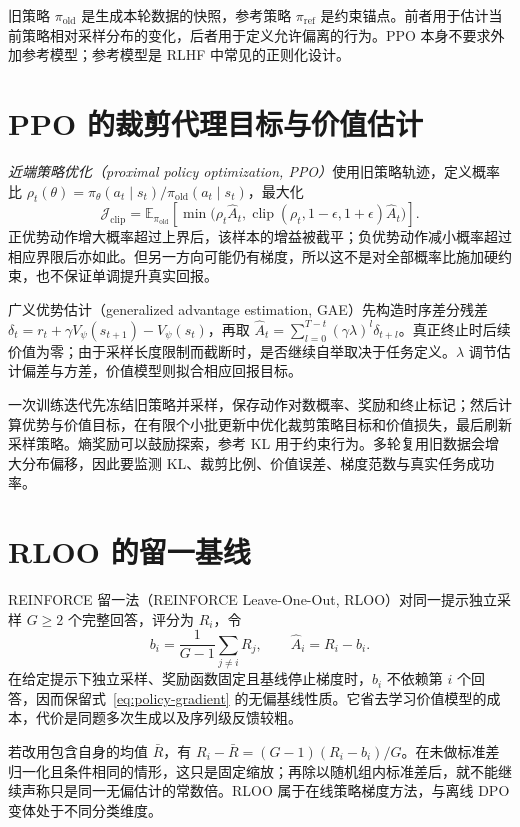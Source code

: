 旧策略 $\pi_{\mathrm{old}}$ 是生成本轮数据的快照，参考策略 $\pi_{\mathrm{ref}}$ 是约束锚点。前者用于估计当前策略相对采样分布的变化，后者用于定义允许偏离的行为。PPO 本身不要求外加参考模型；参考模型是 RLHF 中常见的正则化设计。

\section{PPO 的裁剪代理目标与价值估计}

\emph{近端策略优化（proximal policy optimization, PPO）}使用旧策略轨迹，定义概率比 $\rho_t(\theta)=\pi_\theta(a_t\mid s_t)/\pi_{\mathrm{old}}(a_t\mid s_t)$，最大化
\begin{equation}
\mathcal J_{\mathrm{clip}}=\mathbb E_{\pi_{\mathrm{old}}}\left[
\min\bigl(\rho_t\widehat A_t,
\operatorname{clip}(\rho_t,1-\epsilon,1+\epsilon)\widehat A_t\bigr)\right].
\label{eq:ppo}
\end{equation}
正优势动作增大概率超过上界后，该样本的增益被截平；负优势动作减小概率超过相应界限后亦如此。但另一方向可能仍有梯度，所以这不是对全部概率比施加硬约束，也不保证单调提升真实回报\cite{ppo}。

广义优势估计（generalized advantage estimation, GAE）先构造时序差分残差 $\delta_t=r_t+\gamma V_\psi(s_{t+1})-V_\psi(s_t)$，再取 $\widehat A_t=\sum_{l=0}^{T-t}(\gamma\lambda)^l\delta_{t+l}$。真正终止时后续价值为零；由于采样长度限制而截断时，是否继续自举取决于任务定义。$\lambda$ 调节估计偏差与方差，价值模型则拟合相应回报目标。

一次训练迭代先冻结旧策略并采样，保存动作对数概率、奖励和终止标记；然后计算优势与价值目标，在有限个小批更新中优化裁剪策略目标和价值损失，最后刷新采样策略。熵奖励可以鼓励探索，参考 KL 用于约束行为。多轮复用旧数据会增大分布偏移，因此要监测 KL、裁剪比例、价值误差、梯度范数与真实任务成功率。

\section{RLOO 的留一基线}

REINFORCE 留一法（REINFORCE Leave-One-Out, RLOO）对同一提示独立采样 $G\ge2$ 个完整回答，评分为 $R_i$，令
\[
b_i=\frac1{G-1}\sum_{j\ne i}R_j,\qquad
\widehat A_i=R_i-b_i.
\]
在给定提示下独立采样、奖励函数固定且基线停止梯度时，$b_i$ 不依赖第 $i$ 个回答，因而保留式~\eqref{eq:policy-gradient} 的无偏基线性质。它省去学习价值模型的成本，代价是同题多次生成以及序列级反馈较粗\cite{rloo}。

若改用包含自身的均值 $\bar R$，有 $R_i-\bar R=(G-1)(R_i-b_i)/G$。在未做标准差归一化且条件相同的情形，这只是固定缩放；再除以随机组内标准差后，就不能继续声称只是同一无偏估计的常数倍。RLOO 属于在线策略梯度方法，与离线 DPO 变体处于不同分类维度。


